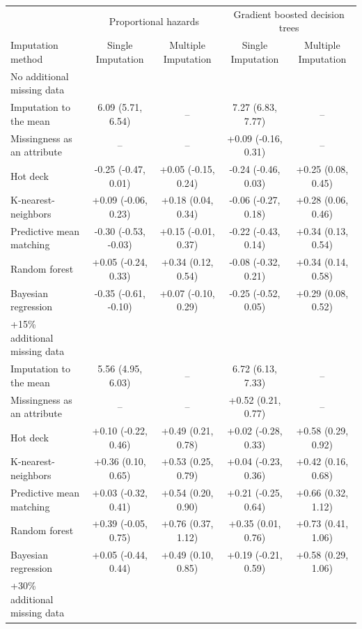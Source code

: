 \documentclass{article}
\begin{document}
\begin{table}
\begin{tabular}{lcccc}
\toprule
& \multicolumn{2}{c}{Proportional hazards} & \multicolumn{2}{c}{Gradient boosted decision trees} \\ 
 \cmidrule(lr){2-3}\cmidrule(lr){4-5}
Imputation method & Single Imputation & Multiple Imputation & Single Imputation & Multiple Imputation \\ 
\midrule
\multicolumn{1}{l}{No additional missing data} \\ 
\midrule
Imputation to the mean & 6.09 (5.71, 6.54) & -- & 7.27 (6.83, 7.77) & -- \\ 
Missingness as an attribute & -- & -- & +0.09 (-0.16, 0.31) & -- \\ 
Hot deck & -0.25 (-0.47, 0.01) & +0.05 (-0.15, 0.24) & -0.24 (-0.46, 0.03) & +0.25 (0.08, 0.45) \\ 
K-nearest-neighbors & +0.09 (-0.06, 0.23) & +0.18 (0.04, 0.34) & -0.06 (-0.27, 0.18) & +0.28 (0.06, 0.46) \\ 
Predictive mean matching & -0.30 (-0.53, -0.03) & +0.15 (-0.01, 0.37) & -0.22 (-0.43, 0.14) & +0.34 (0.13, 0.54) \\ 
Random forest & +0.05 (-0.24, 0.33) & +0.34 (0.12, 0.54) & -0.08 (-0.32, 0.21) & +0.34 (0.14, 0.58) \\ 
Bayesian regression & -0.35 (-0.61, -0.10) & +0.07 (-0.10, 0.29) & -0.25 (-0.52, 0.05) & +0.29 (0.08, 0.52) \\ 
\midrule
\multicolumn{1}{l}{+15\% additional missing data} \\ 
\midrule
Imputation to the mean & 5.56 (4.95, 6.03) & -- & 6.72 (6.13, 7.33) & -- \\ 
Missingness as an attribute & -- & -- & +0.52 (0.21, 0.77) & -- \\ 
Hot deck & +0.10 (-0.22, 0.46) & +0.49 (0.21, 0.78) & +0.02 (-0.28, 0.33) & +0.58 (0.29, 0.92) \\ 
K-nearest-neighbors & +0.36 (0.10, 0.65) & +0.53 (0.25, 0.79) & +0.04 (-0.23, 0.36) & +0.42 (0.16, 0.68) \\ 
Predictive mean matching & +0.03 (-0.32, 0.41) & +0.54 (0.20, 0.90) & +0.21 (-0.25, 0.64) & +0.66 (0.32, 1.12) \\ 
Random forest & +0.39 (-0.05, 0.75) & +0.76 (0.37, 1.12) & +0.35 (0.01, 0.76) & +0.73 (0.41, 1.06) \\ 
Bayesian regression & +0.05 (-0.44, 0.44) & +0.49 (0.10, 0.85) & +0.19 (-0.21, 0.59) & +0.58 (0.29, 1.06) \\ 
\midrule
\multicolumn{1}{l}{+30\% additional missing data} \\ 

\end{tabular}
\end{table}
\end{document}
